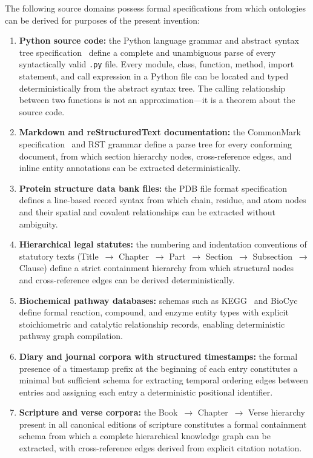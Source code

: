 \documentclass[12pt]{article}
\begin{document}
The following source domains possess formal specifications from which ontologies
can be derived for purposes of the present invention:

\begin{enumerate}[label=(\alph*), leftmargin=2em]
  \item \textbf{Python source code:} the Python language grammar and abstract
  syntax tree specification~\cite{python_ast} define a complete and unambiguous
  parse of every syntactically valid \texttt{.py} file. Every module, class,
  function, method, import statement, and call expression in a Python file can be
  located and typed deterministically from the abstract syntax tree. The calling
  relationship between two functions is not an approximation---it is a theorem
  about the source code.

  \item \textbf{Markdown and reStructuredText documentation:} the CommonMark
  specification~\cite{commonmark} and RST grammar define a parse tree for every
  conforming document, from which section hierarchy nodes, cross-reference edges,
  and inline entity annotations can be extracted deterministically.

  \item \textbf{Protein structure data bank files:} the PDB file format
  specification~\cite{bernstein1977pdb} defines a line-based record syntax from
  which chain, residue, and atom nodes and their spatial and covalent
  relationships can be extracted without ambiguity.

  \item \textbf{Hierarchical legal statutes:} the numbering and indentation
  conventions of statutory texts (Title~$\to$ Chapter~$\to$ Part~$\to$
  Section~$\to$ Subsection~$\to$ Clause) define a strict containment hierarchy
  from which structural nodes and cross-reference edges can be derived
  deterministically.

  \item \textbf{Biochemical pathway databases:} schemas such as KEGG~\cite{kanehisa2000kegg}
  and BioCyc~\cite{karp2019biocyc} define formal reaction, compound, and enzyme
  entity types with explicit stoichiometric and catalytic relationship records,
  enabling deterministic pathway graph compilation.

  \item \textbf{Diary and journal corpora with structured timestamps:} the formal
  presence of a timestamp prefix at the beginning of each entry constitutes a
  minimal but sufficient schema for extracting temporal ordering edges between
  entries and assigning each entry a deterministic positional identifier.

  \item \textbf{Scripture and verse corpora:} the Book~$\to$ Chapter~$\to$ Verse
  hierarchy present in all canonical editions of scripture constitutes a formal
  containment schema from which a complete hierarchical knowledge graph can be
  extracted, with cross-reference edges derived from explicit citation notation.
\end{enumerate}
\end{document}
